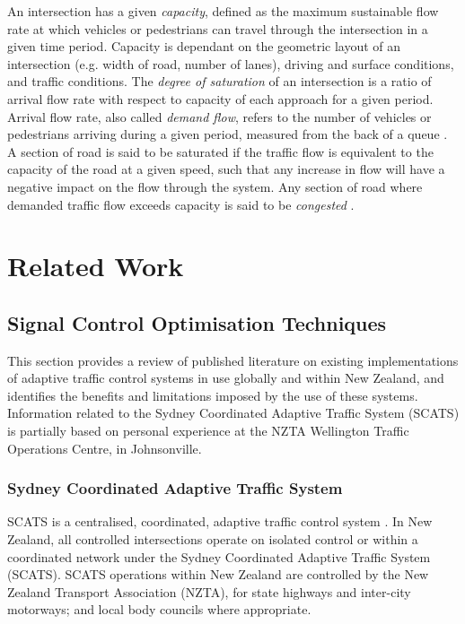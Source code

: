 An intersection has a given \emph{capacity}, defined as the maximum sustainable flow rate at which vehicles or pedestrians can travel through the intersection in a given time period. Capacity is dependant on the geometric layout of an intersection (e.g. width of road, number of lanes), driving and surface conditions, and traffic conditions. The \emph{degree of saturation} of an intersection is a ratio of arrival flow rate with respect to capacity of each approach for a given period. Arrival flow rate, also called \emph{demand flow}, refers to the number of vehicles or pedestrians arriving during a given period, measured from the back of a queue \cite{sidraglossary}. A section of road is said to be saturated if the traffic flow is equivalent to the capacity of the road at a given speed, such that any increase in flow will have a negative impact on the flow through the system. Any section of road where demanded traffic flow exceeds capacity is said to be \emph{congested} \cite{wallis2013costs}.

\chapter{Related Work}

\section{Signal Control Optimisation Techniques}

This section provides a review of published literature on existing implementations of adaptive traffic control systems in use globally and within New Zealand, and identifies the benefits and limitations imposed by the use of these systems. Information related to the Sydney Coordinated Adaptive Traffic System (SCATS) is partially based on personal experience at the NZTA Wellington Traffic Operations Centre, in Johnsonville. 

\subsection{Sydney Coordinated Adaptive Traffic System}

SCATS is a centralised, coordinated, adaptive traffic control system \cite{lowrie1982scats}. In New Zealand, all controlled intersections operate on isolated control or within a coordinated network under the Sydney Coordinated Adaptive Traffic System (SCATS). SCATS operations within New Zealand are controlled by the New Zealand Transport Association (NZTA), for state highways and inter-city motorways; and local body councils where appropriate.

